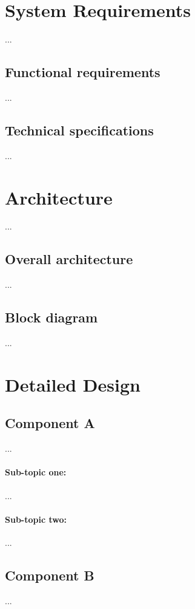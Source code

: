 \section{System Requirements}
...

\subsection{Functional requirements}
...

\subsection{Technical specifications}
...

\section{Architecture}
...

\subsection{Overall architecture}
...

\subsection{Block diagram}
...

\section{Detailed Design}
\subsection{Component A}
...

\paragraph{Sub-topic one:}
...

\paragraph{Sub-topic two:}
...

\subsection{Component B}
...

